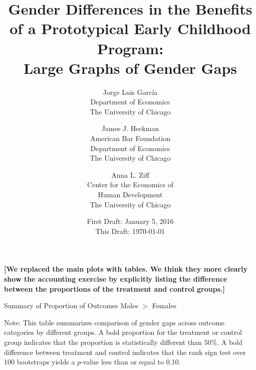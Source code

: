 


\usepackage[stable]{footmisc}

\newcommand*\leftright[2]{%
  \leavevmode
  \rlap{#1}%
  \hspace{0.5\linewidth}%
  #2}

\newcommand{\orth}{\ensuremath{\perp\!\!\!\perp}}%
\newcommand{\indep}{\orth}%
\newcommand{\notorth}{\ensuremath{\perp\!\!\!\!\!\!\diagup\!\!\!\!\!\!\perp}}%
\newcommand{\notindep}{\notorth}




\begin{titlepage}

\title{\Large \textbf{Gender Differences in the Benefits of a Prototypical Early Childhood Program: \\ Large Graphs of Gender Gaps}}

\author{
Jorge Luis Garc\'{i}a\\
Department of Economics\\
The University of Chicago \and
James J. Heckman \\
American Bar Foundation \\
Department of Economics\\
The University of Chicago \and
Anna L. Ziff \\
Center for the Economics of \\
Human Development \\
The University of Chicago}
\date{First Draft: January 5, 2016\\ This Draft: \today}

\maketitle

\textbf{[We replaced the main plots with tables. We think they more clearly show the accounting exercise by explicitly listing the difference between the proportions of the treatment and control groups.]}

\restoregeometry
\end{titlepage}

\begin{table}[H]
\centering
\caption{Summary of Proportion of Outcomes Males $>$ Females}
\label{tab:proportion-table}
\begin{threeparttable}

\begin{tablenotes}
\footnotesize
\item Note: This table summarizes comparison of gender gaps across outcome categories by different groups. A bold proportion for the treatment or control group indicates that the proportion is statistically different than 50\%. A bold difference between treatment and control indicates that the rank sign test over 100 bootstraps yields a $p$-value less than or equal to 0.10. 
\end{tablenotes}
\end{threeparttable}
\end{table}

